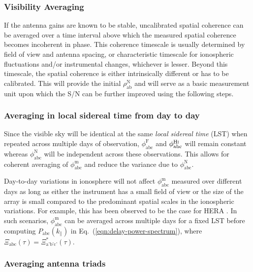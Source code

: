 \documentclass[
reprint,
superscriptaddress,
amsmath,
amssymb,
aps,
]{revtex4-1}
\begin{document}
\subsubsection{Visibility Averaging}\label{sec:vis-avg}

If the antenna gains are known to be stable, uncalibrated spatial coherence can be averaged over a time interval above which the measured spatial coherence becomes incoherent in phase. This coherence timescale is usually determined by field of view and antenna spacing, or characteristic timescale for ionospheric fluctuations and/or instrumental changes, whichever is lesser. Beyond this timescale, the spatial coherence is either intrinsically different or has to be calibrated. This will provide the initial $\rho_\textrm{ab}^\textrm{N}$ and will serve as a basic measurement unit upon which the S/N can be further improved using the following steps. 

\subsubsection{Averaging in local sidereal time from day to day}\label{sec:lst-avg}

Since the visible sky will be identical at the same {\it local sidereal time} (LST) when repeated across multiple days of observation, $\phi_\textrm{abc}^\textrm{F}$ and $\phi_\textrm{abc}^\textrm{H{\sc i}}$ will remain constant whereas $\phi_\textrm{abc}^\textrm{N}$ will be independent across these observations. This allows for coherent averaging of $\phi_\textrm{abc}^\textrm{m}$ and reduce the variance due to $\phi_\textrm{abc}^\textrm{N}$.

Day-to-day variations in ionosphere will not affect $\phi_\textrm{abc}^\textrm{m}$ measured over different days as long as either the instrument has a small field of view or the size of the array is small compared to the predominant spatial scales in the ionospheric variations. For example, this has been observed to be the case for HERA \cite{car18}. In such scenarios, $\phi_\textrm{abc}^\textrm{m}$ can be averaged across multiple days for a fixed LST before computing $P_\textrm{abc}(k_\parallel)$ in Eq.~(\ref{eqn:delay-power-spectrum}), where $\Xi_\textrm{abc}(\tau)=\Xi_\textrm{a'b'c'}^*(\tau)$. 

\subsubsection{Averaging antenna triads}\label{sec:triad-avg}
\end{document}
